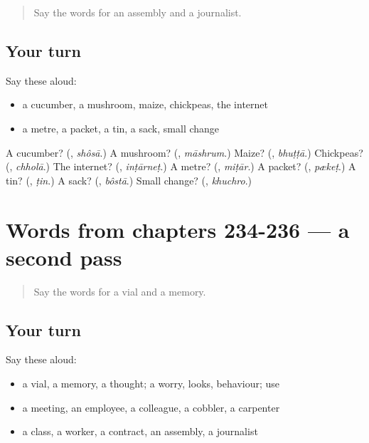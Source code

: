 \label{lesson:BN-R236-first-pass-words-from-chapters-232-233}



\begin{quote}
Say the words for an assembly and a journalist.
\end{quote}

\subsection*{Your turn}
Say these aloud:

\begin{itemize}
\raggedright
  \item a cucumber, a mushroom, maize, chickpeas, the internet
  \item a metre, a packet, a tin, a sack, small change
\end{itemize}

\begin{tcolorbox}[breakable,colback=teal!4,colframe=teal!35!black,title={Before you move on}]
A cucumber? (\textbf{}, \emph{shôsā}.) A mushroom? (\textbf{}, \emph{māshrum}.) Maize? (\textbf{}, \emph{bhuṭṭā}.) Chickpeas? (\textbf{}, \emph{chholā}.) The internet? (\textbf{}, \emph{inṭārneṭ}.) A metre? (\textbf{}, \emph{miṭār}.) A packet? (\textbf{}, \emph{pækeṭ}.) A tin? (\textbf{}, \emph{ṭin}.) A sack? (\textbf{}, \emph{bôstā}.) Small change? (\textbf{}, \emph{khuchro}.)
\end{tcolorbox}
\section[(dialogue)]{Words from chapters 234-236 — a second pass}

\label{lesson:BN-R236-second-pass-words-from-chapters-234-236}



\begin{quote}
Say the words for a vial and a memory.
\end{quote}

\subsection*{Your turn}
Say these aloud:

\begin{itemize}
\raggedright
  \item a vial, a memory, a thought; a worry, looks, behaviour; use
  \item a meeting, an employee, a colleague, a cobbler, a carpenter
  \item a class, a worker, a contract, an assembly, a journalist
\end{itemize}

